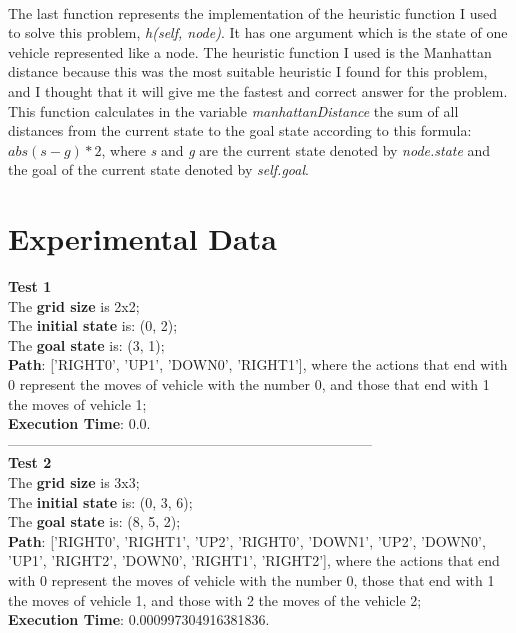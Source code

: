 \documentclass[14pt]{article}
\begin{document}
\vspace{2.5 mm}
\\The last function represents the implementation of the heuristic function I used to solve this problem, \textit{h(self, node)}. It has one argument which is the state of one vehicle represented like a node. The heuristic function I used is the Manhattan distance because this was the most suitable heuristic I found for this problem, and I thought that it will give me the fastest and correct answer for the problem. This function calculates in the variable \textit{manhattanDistance} the sum of all distances from the current state to the goal state according to this formula: $abs(s-g)*2$, where \textit{s} and \textit{g} are the current state denoted by \textit{node.state} and the goal of the current state denoted by \textit{self.goal}.
\newpage
\section{Experimental Data}
\textbf{Test 1}
\\The \textbf{grid size} is 2x2;
\\The \textbf{initial state} is: (0, 2);
\\The \textbf{goal state} is: (3, 1);
\\\textbf{Path}: ['RIGHT0', 'UP1', 'DOWN0', 'RIGHT1'], where the actions that end with 0 represent the moves of vehicle with the number 0, and those that end with 1 the moves of vehicle 1;
\\\textbf{Execution Time}: 0.0.
\vspace{0.5 mm}
\\------------------------------------------------------------------------------
\vspace{0.5 mm}
\\\textbf{Test 2}
\\The \textbf{grid size} is 3x3;
\\The \textbf{initial state} is: (0, 3, 6);
\\The \textbf{goal state} is: (8, 5, 2);
\\\textbf{Path}: ['RIGHT0', 'RIGHT1', 'UP2', 'RIGHT0', 'DOWN1', 'UP2', 'DOWN0', 'UP1', 'RIGHT2', 'DOWN0', 'RIGHT1', 'RIGHT2'], where the actions that end with 0 represent the moves of vehicle with the number 0, those that end with 1 the moves of vehicle 1, and those with 2 the moves of the vehicle 2;
\\\textbf{Execution Time}: 0.000997304916381836.
\vspace{0.5 mm}
\end{document}
